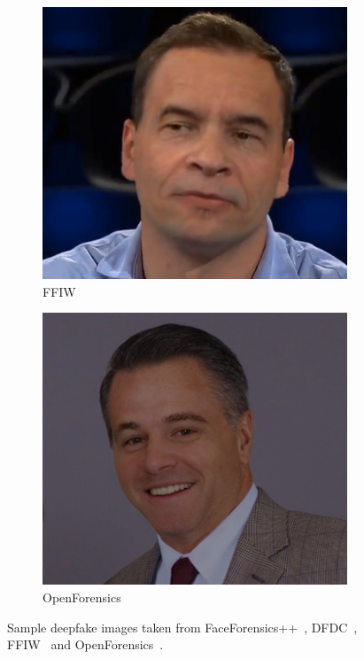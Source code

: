 \begin{figure}[htbp]
\begin{subfigure}{.45\textwidth}
		\includegraphics[width=.8\linewidth]{figures/method3}
		\caption{FFIW}\label{fig:sub3}
	\end{subfigure}%
	\hspace{-5mm}
	\begin{subfigure}{.45\textwidth}
		\centering
		\includegraphics[width=.8\linewidth]{figures/method4}
		\caption{OpenForensics}\label{fig:sub4}
	\end{subfigure}
	\caption{Sample deepfake images taken from FaceForensics++~\cite{roessler2019faceforensicspp},
		DFDC~\cite{dolhansky2020deepfake}, FFIW~\cite{Zhou_2021_CVPR}
		and OpenForensics~\cite{ltnghia-ICCV2021}.}\label{fig:sample-deepfakes}
\end{figure}
